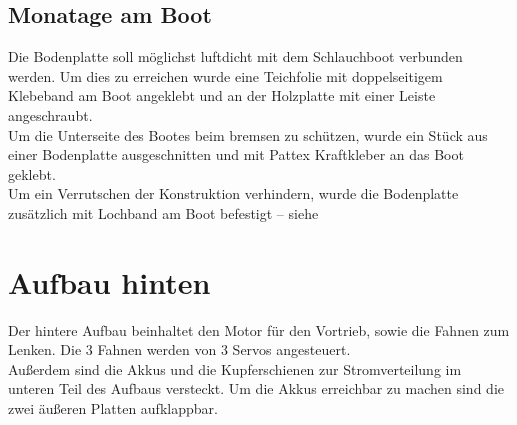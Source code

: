 \subsection{Monatage am Boot}
Die Bodenplatte soll möglichst luftdicht mit dem Schlauchboot verbunden werden. Um dies zu erreichen wurde eine Teichfolie mit doppelseitigem Klebeband am Boot angeklebt und an der Holzplatte mit einer Leiste angeschraubt.\\
Um die Unterseite des Bootes beim bremsen zu schützen, wurde ein Stück aus einer Bodenplatte ausgeschnitten und mit Pattex Kraftkleber an das Boot geklebt.\\
Um ein Verrutschen der Konstruktion verhindern, wurde die Bodenplatte zusätzlich mit Lochband am Boot befestigt -- siehe 


\clearpage
\section{Aufbau hinten}
Der hintere Aufbau beinhaltet den Motor für den Vortrieb, sowie die Fahnen zum Lenken. Die 3 Fahnen werden von 3 Servos angesteuert.\\ Außerdem sind die Akkus und die Kupferschienen zur Stromverteilung im unteren Teil des Aufbaus versteckt. Um die Akkus erreichbar zu machen sind die zwei äußeren Platten aufklappbar.


